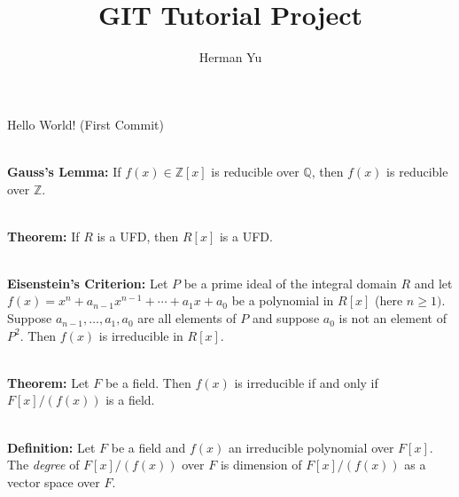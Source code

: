 \documentclass[12pt]{article}
\begin{document}
\title{GIT Tutorial Project}
\date{}
\author{Herman Yu}
\maketitle

Hello World! (First Commit)\par 
\hfill \\
\textbf{Gauss's Lemma:} If $f(x)\in \mathbb{Z}[x]$ is reducible over $\mathbb{Q}$, then $f(x)$ is reducible over $\mathbb{Z}$.\par 
\hfill \\
\textbf{Theorem:} If $R$ is a UFD, then $R[x]$ is a UFD.\par 
\hfill \\
\textbf{Eisenstein's Criterion:} Let $P$ be a prime ideal of the integral domain $R$ and let $f(x)=x^n+a_{n-1}x^{n-1}+\cdots + a_1x+a_0$ be a polynomial in $R[x]$ (here $n\geq 1)$. Suppose $a_{n-1},\dots, a_1,a_0$ are all elements of $P$ and suppose $a_0$ is not an element of $P^2$. Then $f(x)$ is irreducible in $R[x]$.\par 
\hfill \\
\textbf{Theorem:} Let $F$ be a field. Then $f(x)$ is irreducible if and only if $F[x]/(f(x))$ is a field.\par 
\hfill \\
\textbf{Definition:} Let $F$ be a field and $f(x)$ an irreducible polynomial over $F[x]$. The \emph{degree} of $F[x]/(f(x))$ over $F$ is dimension of $F[x]/(f(x))$ as a vector space over $F$.\par 
\end{document}
